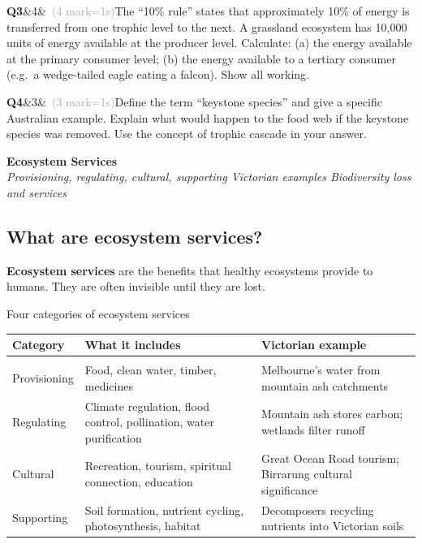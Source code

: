 \documentclass[11pt,a4paper]{article}
\newcommand{\sectiondiv}[3]{%
  \needspace{5\baselineskip}
  \begin{tcolorbox}[
    enhanced, breakable=false, arc=3.5mm,
    colback=ForestDark, colframe=ForestDark, boxrule=0pt,
    sidebyside, sidebyside align=center,
    lefthand width=2.0cm,
    left=2mm, right=4mm, top=4mm, bottom=4mm
  ]
    \begin{center}
      \label{sec:#1}%
      {\headingfont\bfseries\color{Forest!35!ForestDark}\fontsize{50}{50}\selectfont #1}
    \end{center}
    \tcblower
    {\headingfont\bfseries\color{white}\LARGE #2}\\[3pt]
    {\itshape\color{white!75!ForestDark}\small #3}
  \end{tcolorbox}%
}
\newcommand{\answerbox}[1]{%
  \begin{tcolorbox}[
    enhanced, breakable, arc=2mm,
    colback=Paper, colframe=Line,
    left=2mm, right=2mm, top=1mm, bottom=1mm,
    boxrule=1pt,
    height=#1
  ]
  \end{tcolorbox}%
}
\newcommand{\question}[3]{%
  \needspace{3\baselineskip}%
  \medskip
  \noindent\textbf{Q#1}\ifx&#2&\else\ \textcolor{DarkGrey}{(#2 mark\ifnum#2=1\else s\fi)}\fi\quad #3%
  \medskip
}
\begin{document}
\begin{yr8box}
\question{3}{4}{The ``10\% rule'' states that approximately 10\% of energy is transferred from one trophic level to the next. A grassland ecosystem has 10,000 units of energy available at the producer level. Calculate: (a) the energy available at the primary consumer level; (b) the energy available to a tertiary consumer (e.g.\ a wedge-tailed eagle eating a falcon). Show all working.}
\answerbox{8cm}

\question{4}{3}{Define the term ``keystone species'' and give a specific Australian example. Explain what would happen to the food web if the keystone species was removed. Use the concept of trophic cascade in your answer.}
\answerbox{15cm}
\end{yr8box}

\newpage

\sectiondiv{7}{Ecosystem Services}{Provisioning, regulating, cultural, supporting \textbullet{} Victorian examples \textbullet{} Biodiversity loss and services}

\subsection{What are ecosystem services?}

\textbf{Ecosystem services} are the benefits that healthy ecosystems provide to humans. They are often invisible until they are lost.

\begin{infobox}{Four categories of ecosystem services}
\begin{tabular}{@{}L{3cm} L{5cm} L{4.5cm}@{}}
  \textbf{Category} & \textbf{What it includes} & \textbf{Victorian example} \\[2pt]
  \hline\\[-6pt]
  Provisioning  & Food, clean water, timber, medicines & Melbourne's water from mountain ash catchments \\[4pt]
  Regulating    & Climate regulation, flood control, pollination, water purification & Mountain ash stores carbon; wetlands filter runoff \\[4pt]
  Cultural      & Recreation, tourism, spiritual connection, education & Great Ocean Road tourism; Birrarung cultural significance \\[4pt]
  Supporting    & Soil formation, nutrient cycling, photosynthesis, habitat & Decomposers recycling nutrients into Victorian soils \\[4pt]
\end{tabular}
\end{infobox}
\end{document}
